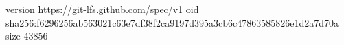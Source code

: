 version https://git-lfs.github.com/spec/v1
oid sha256:f6296256ab563021c63e7df38f2ca9197d395a3cb6c47863585826e1d2a7d70a
size 43856
